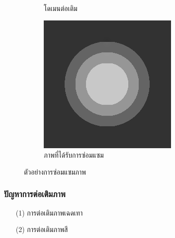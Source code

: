 \documentclass[xcolor=dvipsnames, xetex,serif]{beamer}
\numberwithin{equation}{section}
\begin{document}
\begin{frame}
\begin{figure}[H]
\begin{subfigure}{0.3\linewidth}
                \caption{โดเมนต่อเติม}
            \end{subfigure}
            \begin{subfigure}{0.3\linewidth}
                \centering
                \includegraphics[width=0.8\linewidth]{images/grayscale_inpaint/result_splitbergman.png}
                \caption{ภาพที่ได้รับการซ่อมแซม}
            \end{subfigure}
            \caption{ตัวอย่างการซ่อมแซมภาพ}
            \label{fig1}
        \end{figure}
    \end{frame}
    \begin{frame}
        \frametitle{ปัญหาการต่อเติมภาพ}
        \begin{itemize}
            \item[(1)] การต่อเติมภาพเฉดเทา
            \item[(2)] การต่อเติมภาพสี
        \end{itemize}
    \end{frame}
\end{document}
